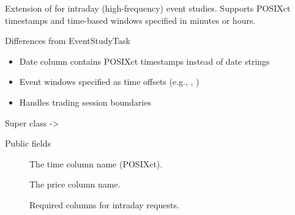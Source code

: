 \documentclass[a4paper]{book}
\begin{document}
%
\begin{Description}
Extension of  for intraday (high-frequency)
event studies. Supports POSIXct timestamps and time-based windows
specified in minutes or hours.
\end{Description}
%
\begin{Section}{Differences from EventStudyTask}

\begin{itemize}

\item{} Date column contains POSIXct timestamps instead of date strings
\item{} Event windows specified as time offsets (e.g., , )
\item{} Handles trading session boundaries

\end{itemize}

\end{Section}
%
\begin{Section}{Super class}
 -> 
\end{Section}
%
\begin{Section}{Public fields}

\begin{description}

\item[] The time column name (POSIXct).

\item[] The price column name.

\item[] Required columns for intraday requests.

\end{description}


\end{Section}
%
\end{document}

